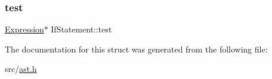 \mbox{\label{struct_if_statement_ab7d44c6a4d1e70ab2d1053a2b076b8df}} 
\subsubsection{\texorpdfstring{test}{test}}
{\footnotesize\ttfamily \hyperlink{struct_expression}{Expression}$\ast$ If\+Statement\+::test}



The documentation for this struct was generated from the following file\+:\begin{DoxyCompactItemize}
\item 
src/\hyperlink{ast_8h}{ast.\+h}\end{DoxyCompactItemize}
